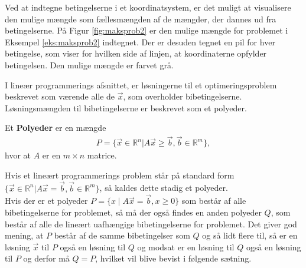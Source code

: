 \begin{eks}
Ved at indtegne betingelserne i et koordinatsystem, er det muligt at visualisere den mulige mængde som fællesmængden af de mængder, der dannes ud fra betingelserne. På Figur \ref{fig:maksprob2} er den mulige mængde for problemet i Eksempel \ref{eks:maksprob2} indtegnet. Der er desuden tegnet en pil for hver betingelse, som viser for hvilken side af linjen, at koordinaterne opfylder betingelsen. Den mulige mængde er farvet grå.

\begin{center}
	
	\label{fig:maksprob2}
\end{center}

\end{eks}



I lineær programmerings afsnittet, er løsningerne til et optimeringsproblem beskrevet som værende alle de $\vec{x}$, som overholder bibetingelserne. Løsningsmængden til bibetingelserne er beskrevet som et polyeder.
\begin{defn} [Polyeder]
Et \textbf{Polyeder} er en mængde 
\begin{align*}
 P =\{ \vec{x} \in \mathds{R}^n | A \vec{x} \geq \vec{b}, \vec{b}\in \mathds{R}^m\},
\end{align*}
hvor at $A$ er en $m \times n$ matrice.
\end{defn}
Hvis et lineært programmerings problem står på standard form $\{ \vec{x} \in \mathds{R}^n | A \vec{x} = \vec{b}, \vec{b}\in \mathds{R}^m\}$, så kaldes dette stadig et polyeder.\\

Hvis der er et polyeder $P=\{x\mid A\vec{x}=\vec{b},x\geq 0\}$ som består af alle bibetingelserne for problemet, så må der også findes en anden polyeder $Q$, som består af alle de lineært uafhængige bibetingelserne for problemet. Det giver god mening, at $P$ består af de samme bibetingelser som $Q$ og så lidt flere til, så er en løsning $\vec{x}$ til $P$ også en løsning til $Q$ og modsat er en løsning til $Q$ også en løsning til $P$ og derfor må $Q=P$, hvilket vil blive bevist i følgende sætning.

